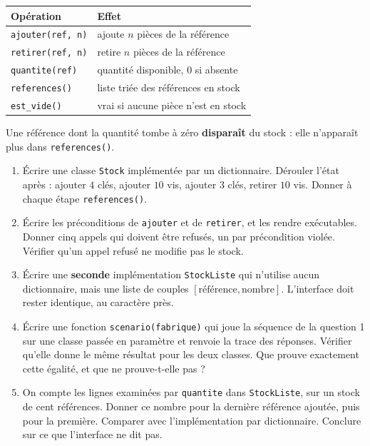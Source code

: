 \begin{center}
\begin{tabular}{|l|l|}
\hline
\textbf{Opération} & \textbf{Effet} \\
\hline
\texttt{ajouter(ref, n)} & ajoute $n$ pièces de la référence \\
\hline
\texttt{retirer(ref, n)} & retire $n$ pièces de la référence \\
\hline
\texttt{quantite(ref)} & quantité disponible, $0$ si absente \\
\hline
\texttt{references()} & liste triée des références en stock \\
\hline
\texttt{est\_vide()} & vrai si aucune pièce n'est en stock \\
\hline
\end{tabular}
\end{center}

Une référence dont la quantité tombe à zéro \textbf{disparaît} du stock : elle
n'apparaît plus dans \lstinline{references()}.

\begin{enumerate}
  \item Écrire une classe \lstinline{Stock} implémentée par un dictionnaire.
    Dérouler l'état après : ajouter $4$ clés, ajouter $10$ vis, ajouter $3$
    clés, retirer $10$ vis. Donner à chaque étape \lstinline{references()}.

  \item Écrire les préconditions de \lstinline{ajouter} et de
    \lstinline{retirer}, et les rendre exécutables. Donner cinq appels qui
    doivent être refusés, un par précondition violée. Vérifier qu'un appel
    refusé ne modifie pas le stock.

  \item Écrire une \textbf{seconde} implémentation \lstinline{StockListe} qui
    n'utilise aucun dictionnaire, mais une liste de couples
    $[\text{référence}, \text{nombre}]$. L'interface doit rester identique, au
    caractère près.

  \item Écrire une fonction \lstinline{scenario(fabrique)} qui joue la séquence
    de la question 1 sur une classe passée en paramètre et renvoie la trace des
    réponses. Vérifier qu'elle donne le même résultat pour les deux classes.
    Que prouve exactement cette égalité, et que ne prouve-t-elle pas ?

  \item On compte les lignes examinées par \lstinline{quantite} dans
    \lstinline{StockListe}, sur un stock de cent références. Donner ce nombre
    pour la dernière référence ajoutée, puis pour la première. Comparer avec
    l'implémentation par dictionnaire. Conclure sur ce que l'interface ne dit
    pas.
\end{enumerate}

